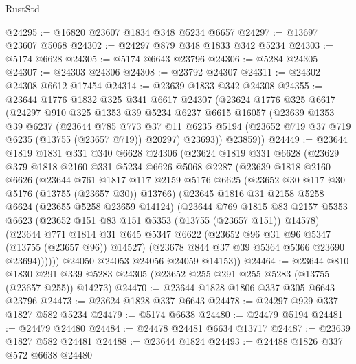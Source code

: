\begin{lexlean}{RustStd}
\begin{coremodule}
@24295 := @16820 @23607 @1834 @348 @5234 @6657
@24297 := @13697 @23607 @5068
@24302 := @24297 @879 @348 @1833 @342 @5234
@24303 := @5174 @6628
@24305 := @5174 @6643 @23796
@24306 := @5284 @24305
@24307 := @24303 @24306
@24308 := @23792 @24307
@24311 := @24302 @24308 @6612 @17454
@24314 := @23639 @1833 @342 @24308
@24355 := @23644
    @1776
    @1832
    @325
    @341
    @6617
    @24307
    (@23624
      @1776
      @325
      @6617
      (@24297
        @910
        @325
        @1353
        @39
        @5234
        @6237
        @6615
        @16057
        (@23639
          @1353
          @39
          @6237
          (@23644
            @785
            @773
            @37
            @11
            @6235
            @5194
            (@23652 @719 @37 @719 @6235 (@13755 (@23657 @719)) @20297)
            @23693))
        @23859))
@24449 := @23644
    @1819
    @1831
    @331
    @340
    @6628
    @24306
    (@23624
      @1819
      @331
      @6628
      (@23629
        @379
        @1818
        @2160
        @331
        @5234
        @6626
        @5068
        @2287
        (@23639
          @1818
          @2160
          @6626
          (@23644
            @761
            @1817
            @117
            @2159
            @5176
            @6625
            (@23652 @30 @117 @30 @5176 (@13755 (@23657 @30)) @13766)
            (@23645
              @1816
              @31
              @2158
              @5258
              @6624
              (@23655 @5258 @23659 @14124)
              (@23644
                @769
                @1815
                @83
                @2157
                @5353
                @6623
                (@23652 @151 @83 @151 @5353 (@13755 (@23657 @151)) @14578)
                (@23644
                  @771
                  @1814
                  @31
                  @645
                  @5347
                  @6622
                  (@23652 @96 @31 @96 @5347 (@13755 (@23657 @96)) @14527)
                  (@23678 @844 @37 @39 @5364 @5366 @23690 @23694))))))
        @24050
        @24053
        @24056
        @24059
        @14153))
@24464 := @23644
    @810
    @1830
    @291
    @339
    @5283
    @24305
    (@23652 @255 @291 @255 @5283 (@13755 (@23657 @255)) @14273)
@24470 := @23644 @1828 @1806 @337 @305 @6643 @23796
@24473 := @23624 @1828 @337 @6643
@24478 := @24297 @929 @337 @1827 @582 @5234
@24479 := @5174 @6638
@24480 := @24479 @5194
@24481 := @24479 @24480
@24484 := @24478 @24481 @6634 @13717
@24487 := @23639 @1827 @582 @24481
@24488 := @23644 @1824
@24493 := @24488 @1826 @337 @572 @6638 @24480

\end{coremodule}
\end{lexlean}
